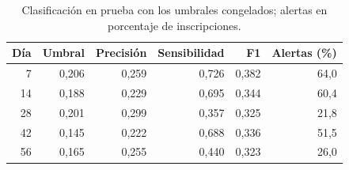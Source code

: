 \begin{table}[!htbp]\centering
\caption{Clasificación en prueba con los umbrales congelados; alertas en porcentaje de inscripciones.}\label{res:alertas}
\begin{tabular}{rrrrrr}
\toprule
Día & Umbral & Precisión & Sensibilidad & F1 & Alertas (\%)\\
\midrule
7 & 0,206 & 0,259 & 0,726 & 0,382 & 64,0\\
14 & 0,188 & 0,229 & 0,695 & 0,344 & 60,4\\
28 & 0,201 & 0,299 & 0,357 & 0,325 & 21,8\\
42 & 0,145 & 0,222 & 0,688 & 0,336 & 51,5\\
56 & 0,165 & 0,255 & 0,440 & 0,323 & 26,0\\
\bottomrule
\end{tabular}
\end{table}
